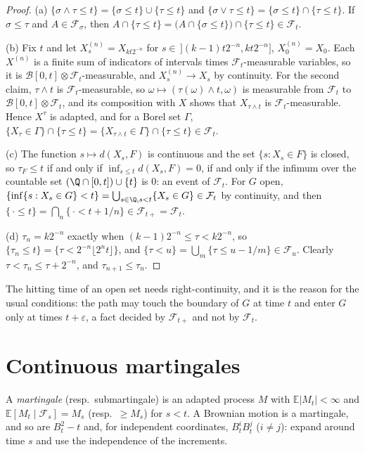 \begin{proof}
(a) $\{\sigma\wedge\tau\le t\}=\{\sigma\le t\}\cup\{\tau\le t\}$ and $\{\sigma\vee\tau\le t\}=\{\sigma\le t\}\cap\{\tau\le t\}$. If $\sigma\le\tau$ and $A\in\mathcal F_\sigma$, then
$A\cap\{\tau\le t\}=\bigl(A\cap\{\sigma\le t\}\bigr)\cap\{\tau\le t\}\in\mathcal F_t$.

(b) Fix $t$ and let $X^{(n)}_s=X_{kt2^{-n}}$ for $s\in\,](k-1)t2^{-n},kt2^{-n}]$, $X^{(n)}_0=X_0$. Each $X^{(n)}$ is a finite sum of indicators of intervals times $\mathcal F_t$-measurable variables, so it is
$\mathcal B[0,t]\otimes\mathcal F_t$-measurable, and $X^{(n)}_s\to X_s$ by continuity. For the second claim, $\tau\wedge t$ is $\mathcal F_t$-measurable, so $\omega\mapsto(\tau(\omega)\wedge t,\omega)$ is measurable
from $\mathcal F_t$ to $\mathcal B[0,t]\otimes\mathcal F_t$, and its composition with $X$ shows that $X_{\tau\wedge t}$ is $\mathcal F_t$-measurable. Hence $X^\tau$ is adapted, and for a Borel set $\Gamma$,
$\{X_\tau\in\Gamma\}\cap\{\tau\le t\}=\{X_{\tau\wedge t}\in\Gamma\}\cap\{\tau\le t\}\in\mathcal F_t$.

(c) The function $s\mapsto d(X_s,F)$ is continuous and the set $\{s:X_s\in F\}$ is closed, so $\tau_F\le t$ if and only if $\inf_{s\le t}d(X_s,F)=0$, if and only if the infimum over the countable set
$(\Q\cap[0,t])\cup\{t\}$ is $0$: an event of $\mathcal F_t$. For $G$ open, $\{\inf\{s:X_s\in G\}<t\}=\bigcup_{s\in\Q,s<t}\{X_s\in G\}\in\mathcal F_t$ by continuity, and then
$\{\,\cdot\le t\}=\bigcap_n\{\,\cdot<t+1/n\}\in\mathcal F_{t+}=\mathcal F_t$.

(d) $\tau_n=k2^{-n}$ exactly when $(k-1)2^{-n}\le\tau<k2^{-n}$, so $\{\tau_n\le t\}=\{\tau<2^{-n}\lfloor2^nt\rfloor\}$, and $\{\tau<u\}=\bigcup_m\{\tau\le u-1/m\}\in\mathcal F_u$. Clearly
$\tau<\tau_n\le\tau+2^{-n}$, and $\tau_{n+1}\le\tau_n$.
\end{proof}

The hitting time of an open set needs right-continuity, and it is the reason for the usual conditions: the path may touch the boundary of $G$ at time $t$ and enter $G$ only at times
$t+\varepsilon$, a fact decided by $\mathcal F_{t+}$ and not by $\mathcal F_t$.

\section{Continuous martingales}

A \emph{martingale} (resp.\ submartingale) is an adapted process $M$ with $\mathbb E|M_t|<\infty$ and $\mathbb E[M_t\mid\mathcal F_s]=M_s$ (resp.\ $\ge M_s$) for $s<t$. A Brownian motion is a martingale, and so are
$B_t^2-t$ and, for independent coordinates, $B^i_tB^j_t$ ($i\ne j$): expand around time $s$ and use the independence of the increments.

